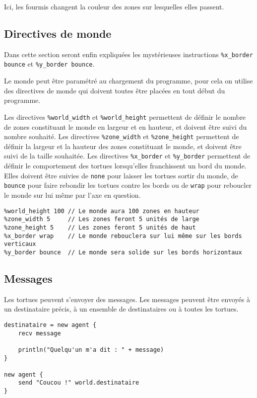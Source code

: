 Ici, les fourmis changent la couleur des zones sur lesquelles elles passent.

\subsection{Directives de monde}

Dans cette section seront enfin expliquées les mystérieuses instructions \verb|%x_border bounce| et \verb|%y_border bounce|.

Le monde peut être paramétré au chargement du programme, pour cela on utilise des directives de monde qui doivent toutes être placées en tout début du programme.

Les directives \verb|%world_width| et \verb|%world_height| permettent de définir le nombre de zones constituant le monde en largeur et en hauteur, et doivent être suivi du nombre souhaité.
Les directives \verb|%zone_width| et \verb|%zone_height| permettent de définir la largeur et la hauteur des zones constituant le monde, et doivent être suivi de la taille souhaitée.
Les directives \verb|%x_border| et \verb|%y_border| permettent de définir le comportement des tortues lorsqu'elles franchissent un bord du monde. Elles doivent être suivies de \verb|none| pour laisser les tortues sortir du monde, de \verb|bounce| pour faire rebondir les tortues contre les bords ou de \verb|wrap| pour reboucler le monde sur lui même par l'axe en question.

\begin{lstlisting}[language=Stibbons]
%world_width 100  // Le monde aura 100 zones en largeur
%world_height 100 // Le monde aura 100 zones en hauteur
%zone_width 5     // Les zones feront 5 unités de large
%zone_height 5    // Les zones feront 5 unités de haut
%x_border wrap    // Le monde rebouclera sur lui même sur les bords verticaux
%y_border bounce  // Le monde sera solide sur les bords horizontaux
\end{lstlisting}

\subsection{Messages}

Les tortues peuvent s'envoyer des messages. Les messages peuvent être envoyés à un destinataire précis, à un ensemble de destinataires ou à toutes les tortues.

\begin{lstlisting}[language=Stibbons]
destinataire = new agent {
    recv message

    println("Quelqu'un m'a dit : " + message)
}

new agent {
    send "Coucou !" world.destinataire
}
\end{lstlisting}

